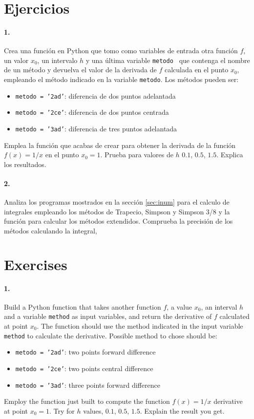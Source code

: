 \begin{paracol}{2}
\section{Ejercicios}
\paragraph{1.} Crea una función en Python que tomo como variables de entrada otra función $f$, un valor $x_0$, un intervalo $h$ y una última variable \texttt{metodo } que contenga el nombre de un método y devuelva el valor de la derivada de $f$ calculada en el punto $x_0$, empleando el método indicado en la variable \texttt{metodo}.  Los métodos pueden ser:
\begin{itemize}
\item \texttt{metodo = '2ad'}: diferencia de dos puntos adelantada
\item \texttt{metodo = '2ce'}: diferencia de dos puntos centrada
\item \texttt{metodo = '3ad'}: diferencia de tres puntos adelantada
\end{itemize}
Emplea la función que acabas de crear para obtener la derivada de la función $f(x) = 1/x$ en el punto $x_0 = 1$. Prueba para valores de $h$ $0.1$, $0.5$, $1.5$. Explica los resultados. 

\paragraph{2.} Analiza los programas mostrados en la sección \ref{sec:inum} para el calculo de integrales empleando los métodos de Trapecio, Simpson y Simpson 3/8 y la función para calcular los métodos extendidos. Comprueba la precisión de los métodos calculando la integral,

\switchcolumn
\section{Exercises}
\paragraph{1.} Build a Python function that takes another function $f$, a value $x_0$, an interval $h$ and a variable \texttt{method} as input variables, and return the derivative of $f$ calculated at point $x_0$. The function should use the method indicated in the input variable \texttt{method} to calculate the derivative. Possible method to chose should be:
\begin{itemize}
	\item \texttt{metodo = '2ad'}: two points forward difference
	\item \texttt{metodo = '2ce'}: two points central difference
	\item \texttt{metodo = '3ad'}: three points forward difference
\end{itemize}
Employ the function just built to compute the function $f(x) = 1/x$ derivative at point $x_0 = 1$. Try for $h$ values,  $0.1$, $0.5$, $1.5$. Explain the result you get.


\end{paracol}
